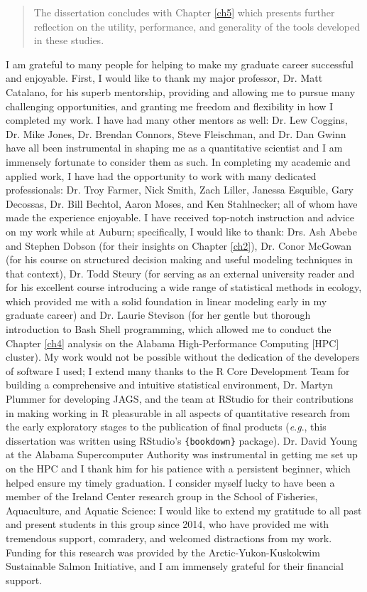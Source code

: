 \documentclass[12pt,]{book}
\theoremstyle{definition}
\theoremstyle{definition}
\theoremstyle{definition}
\theoremstyle{remark}
\begin{document}
\begin{romanpages}
\begin{abstract}
The dissertation concludes with Chapter \ref{ch5} which presents further reflection on the utility, performance, and generality of the tools developed in these studies.

\end{abstract}

\begin{acknowledgments}
\noindent
I am grateful to many people for helping to make my graduate career successful and enjoyable. First, I would like to thank my major professor, Dr. Matt Catalano, for his superb mentorship, providing and allowing me to pursue many challenging opportunities, and granting me freedom and flexibility in how I completed my work. I have had many other mentors as well: Dr. Lew Coggins, Dr. Mike Jones, Dr. Brendan Connors, Steve Fleischman, and Dr. Dan Gwinn have all been instrumental in shaping me as a quantitative scientist and I am immensely fortunate to consider them as such. In completing my academic and applied work, I have had the opportunity to work with many dedicated professionals: Dr. Troy Farmer, Nick Smith, Zach Liller, Janessa Esquible, Gary Decossas, Dr. Bill Bechtol, Aaron Moses, and Ken Stahlnecker; all of whom have made the experience enjoyable. I have received top-notch instruction and advice on my work while at Auburn; specifically, I would like to thank: Drs. Ash Abebe and Stephen Dobson (for their insights on Chapter \ref{ch2}), Dr. Conor McGowan (for his course on structured decision making and useful modeling techniques in that context), Dr. Todd Steury (for serving as an external university reader and for his excellent course introducing a wide range of statistical methods in ecology, which provided me with a solid foundation in linear modeling early in my graduate career) and Dr. Laurie Stevison (for her gentle but thorough introduction to Bash Shell programming, which allowed me to conduct the Chapter \ref{ch4} analysis on the Alabama High-Performance Computing [HPC] cluster). My work would not be possible without the dedication of the developers of software I used; I extend many thanks to the R Core Development Team for building a comprehensive and intuitive statistical environment, Dr. Martyn Plummer for developing JAGS, and the team at RStudio for their contributions in making working in R pleasurable in all aspects of quantitative research from the early exploratory stages to the publication of final products (\textit{e}.\textit{g}., this dissertation was written using RStudio's \texttt{\{bookdown\}} package). Dr. David Young at the Alabama Supercomputer Authority was instrumental in getting me set up on the HPC and I thank him for his patience with a persistent beginner, which helped ensure my timely graduation. I consider myself lucky to have been a member of the Ireland Center research group in the School of Fisheries, Aquaculture, and Aquatic Science: I would like to extend my gratitude to all past and present students in this group since 2014, who have provided me with tremendous support, comradery, and welcomed distractions from my work. Funding for this research was provided by the Arctic-Yukon-Kuskokwim Sustainable Salmon Initiative, and I am immensely grateful for their financial support. 
\end{acknowledgments}
\end{romanpages}
\end{document}
